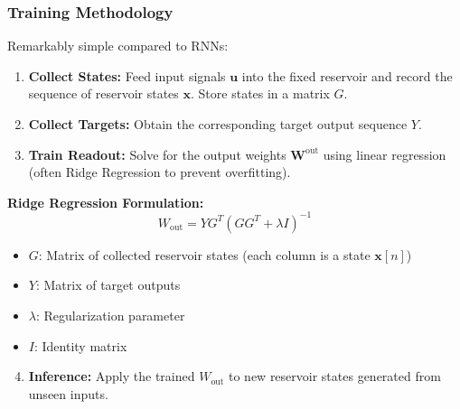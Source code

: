 \documentclass{beamer}
\begin{document}
\begin{frame}
    \frametitle{Training Methodology}
    Remarkably simple compared to RNNs:
    \begin{enumerate}
        \item \textbf{Collect States:} Feed input signals $\mathbf{u}$ into the fixed reservoir and record the sequence of reservoir states $\mathbf{x}$. Store states in a matrix $G$.
        \item \textbf{Collect Targets:} Obtain the corresponding target output sequence $Y$.
        \item \textbf{Train Readout:} Solve for the output weights $\mathbf{W}^{\mathrm{out}}$ using linear regression (often Ridge Regression to prevent overfitting).
    \end{enumerate}
    \pause
    \textbf{Ridge Regression Formulation:}
    \[
    W_{\text{out}} = YG^T\left(GG^T + \lambda I\right)^{-1}
    \]
    \begin{itemize}
        \item $G$: Matrix of collected reservoir states (each column is a state $\mathbf{x}[n]$)
        \item $Y$: Matrix of target outputs
        \item $\lambda$: Regularization parameter
        \item $I$: Identity matrix
    \end{itemize}
    \pause
    \begin{enumerate}
        \setcounter{enumi}{3}
        \item \textbf{Inference:} Apply the trained $W_{\text{out}}$ to new reservoir states generated from unseen inputs.
    \end{enumerate}
\end{frame}
\end{document}
